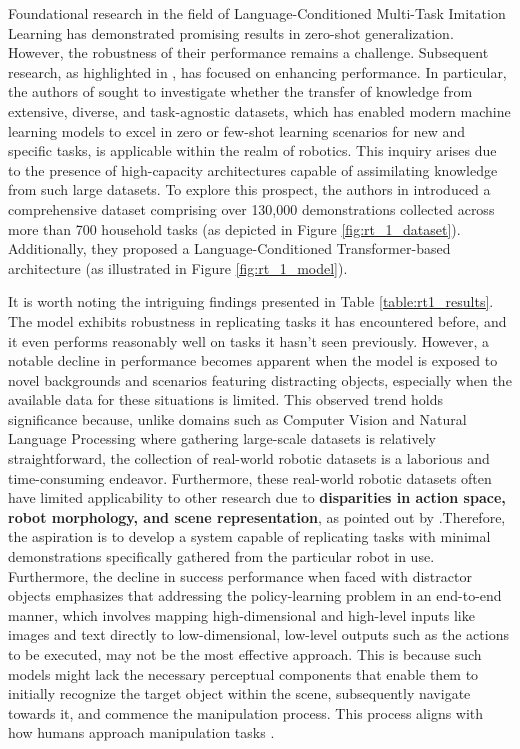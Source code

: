 
\newline Foundational research in the field of Language-Conditioned Multi-Task Imitation Learning has demonstrated promising results in zero-shot generalization. However, the robustness of their performance remains a challenge. Subsequent research, as highlighted in \cite{brohan2022rt,mees2022calvin,mees2022hulc}, has focused on enhancing performance. In particular, the authors of \cite{brohan2022rt} sought to investigate whether the transfer of knowledge from extensive, diverse, and task-agnostic datasets, which has enabled modern machine learning models to excel in zero or few-shot learning scenarios for new and specific tasks, is applicable within the realm of robotics. This inquiry arises due to the presence of high-capacity architectures capable of assimilating knowledge from such large datasets. To explore this prospect, the authors in \cite{brohan2022rt} introduced a comprehensive dataset comprising over 130,000 demonstrations collected across more than 700 household tasks (as depicted in Figure \ref{fig:rt_1_dataset}). Additionally, they proposed a Language-Conditioned Transformer-based architecture (as illustrated in Figure \ref{fig:rt_1_model}).


It is worth noting the intriguing findings presented in Table \ref{table:rt1_results}. The model exhibits robustness in replicating tasks it has encountered before, and it even performs reasonably well on tasks it hasn't seen previously. However, a notable decline in performance becomes apparent when the model is exposed to novel backgrounds and scenarios featuring distracting objects, especially when the available data for these situations is limited. This observed trend holds significance because, unlike domains such as Computer Vision and Natural Language Processing where gathering large-scale datasets is relatively straightforward, the collection of real-world robotic datasets is a laborious and time-consuming endeavor. Furthermore, these real-world robotic datasets often have limited applicability to other research due to \textbf{disparities in action space, robot morphology, and scene representation}, as pointed out by \cite{brohan2022rt}.Therefore, the aspiration is to develop a system capable of replicating tasks with minimal demonstrations specifically gathered from the particular robot in use.
\newline Furthermore, the decline in success performance when faced with distractor objects emphasizes that addressing the policy-learning problem in an end-to-end manner, which involves mapping high-dimensional and high-level inputs like images and text directly to low-dimensional, low-level outputs such as the actions to be executed, may not be the most effective approach. This is because such models might lack the necessary perceptual components that enable them to initially recognize the target object within the scene, subsequently navigate towards it, and commence the manipulation process. This process aligns with how humans approach manipulation tasks \cite{grill2003neural}.
